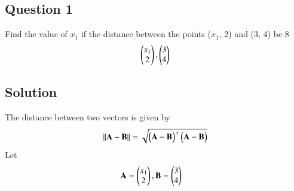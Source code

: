 \documentclass[journal,12pt,twocolumn]{IEEEtran}
\renewcommand\thesection{\arabic{section}}
\renewcommand\thesubsection{\thesection.\arabic{subsection}}
\renewcommand\thesubsubsection{\thesubsection.\arabic{subsubsection}}
\begin{document}
\subsection{Question 1}
\item
Find the value of $x_1$ if the distance between the points ($x_1$, 2)
and (3, 4) be 8
\begin{align}
\begin{pmatrix}x_1\\2\end{pmatrix}, \begin{pmatrix}3\\4\end{pmatrix} \label{eq:1}
\end{align}
\subsection{Solution}
\item
The distance between two vectors is given by 
\begin{align}
\lVert\mathbf{A}-\mathbf{B}\rVert=\sqrt{\begin{pmatrix}\mathbf{A}-\mathbf{B}\end{pmatrix}^\intercal \begin{pmatrix}\mathbf{A}-\mathbf{B}\end{pmatrix}} \label{eq:1.1}
\end{align}
Let
\begin{align}
\mathbf{A}&=\begin{pmatrix}x_1\\2\end{pmatrix}, \mathbf{B}=\begin{pmatrix}3\\4\end{pmatrix} \nonumber    
\end{align}
\end{document}
